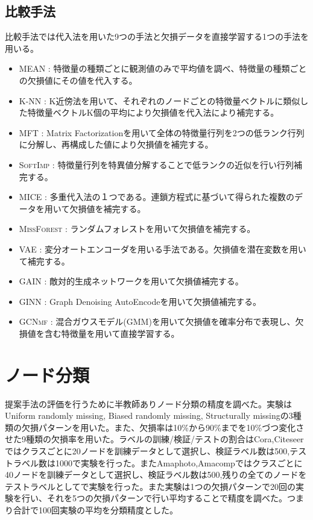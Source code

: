 \subsection{比較手法}
比較手法では代入法を用いた9つの手法と欠損データを直接学習する1つの手法を用いる。
\begin{itemize}
    \item \textsc{MEAN} \cite{GarciaLaencina2010}: 
        特徴量の種類ごとに観測値のみで平均値を調べ、特徴量の種類ごとの欠損値にその値を代入する。
    \item \textsc{K-NN} \cite{batista2002study}:
        K近傍法を用いて、それぞれのノードごとの特徴量ベクトルに類似した特徴量ベクトルK個の平均により欠損値を代入法により補完する。
    \item \textsc{MFT} \cite{koren2009mf}:
       Matrix Factorizationを用いて全体の特徴量行列を2つの低ランク行列に分解し、再構成した値により欠損値を補完する。
    \item \textsc{SoftImp} \cite{mazumder2010soft}:
        特徴量行列を特異値分解することで低ランクの近似を行い行列補完する。
    \item \textsc{MICE} \cite{buuren2010mice}:
        多重代入法\cite{rubin2004multiple}の１つである。連鎖方程式に基づいて得られた複数のデータを用いて欠損値を補完する。
    \item \textsc{MissForest} \cite{Stekhoven2011missforest}:
        ランダムフォレストを用いて欠損値を補完する。
    \item \textsc{VAE} \cite{kingma2013auto}:
        変分オートエンコーダを用いる手法である。欠損値を潜在変数を用いて補完する。
    \item \textsc{GAIN} \cite{yoon2018gain}:
        敵対的生成ネットワークを用いて欠損値補完する。
    \item \textsc{GINN} \cite{spinelli2019ginn}:
        Graph Denoising AutoEncodeを用いて欠損値補完する。
    \item \textsc{GCNmf} \cite{taguchi2021graph}:
        混合ガウスモデル(GMM)を用いて欠損値を確率分布で表現し、欠損値を含む特徴量を用いて直接学習する。
\end{itemize}

\section{ノード分類}
提案手法の評価を行うために半教師ありノード分類の精度を調べた。実験はUniform randomly missing, Biased randomly missing, Structurally missingの3種類の欠損パターンを用いた。また、欠損率は10\%から90\%までを10\%づつ変化させた9種類の欠損率を用いた。ラベルの訓練/検証/テストの割合はCora,Citeseerではクラスごとに20ノードを訓練データとして選択し、検証ラベル数は500,テストラベル数は1000で実験を行った。またAmaphoto,Amacompではクラスごとに40ノードを訓練データとして選択し、検証ラベル数は500,残りの全てのノードをテストラベルとしてで実験を行った。また実験は1つの欠損パターンで20回の実験を行い、それを5つの欠損パターンで行い平均することで精度を調べた。つまり合計で100回実験の平均を分類精度とした。


